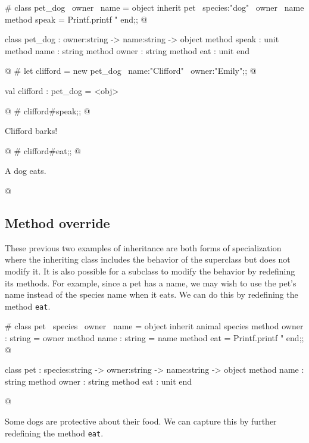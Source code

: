\begin{ocaml}
# class pet_dog ~owner ~name =
  object
     inherit pet ~species:"dog" ~owner ~name
     method speak = Printf.printf "%
  end;;
@
\begin{topoutput}
class pet_dog : owner:string -> name:string ->
  object
    method speak : unit
    method name : string
    method owner : string
    method eat : unit
  end
\end{topoutput}
@
# let clifford = new pet_dog ~name:"Clifford" ~owner:"Emily";;
@
\begin{topoutput}
val clifford : pet_dog = <obj>
\end{topoutput}
@
# clifford#speak;;
@
\begin{topoutput}
Clifford barks!
\end{topoutput}
@
# clifford#eat;;
@
\begin{topoutput}
A dog eats.
\end{topoutput}
@
\end{ocaml}

\subsection{Method override}

These previous two examples of inheritance are both forms of specialization where the inheriting
class includes the behavior of the superclass but does not modify it.  It is also possible for a
subclass to modify the behavior by redefining its methods.  For example, since a pet has a name, we
may wish to use the pet's name instead of the species name when it eats.  We can do this by
redefining the method \hbox{\lstinline/eat/}.

\begin{ocaml}
# class pet ~species ~owner ~name =
object
   inherit animal species
   method owner : string = owner
   method name : string = name
   method eat = Printf.printf "%
end;;
@
\begin{topoutput}
class pet : species:string -> owner:string -> name:string ->
  object method name : string method owner : string method eat : unit end
\end{topoutput}
@
\end{ocaml}
%
Some dogs are protective about their food.  We can capture this by further
redefining the method \hbox{\lstinline/eat/}.

